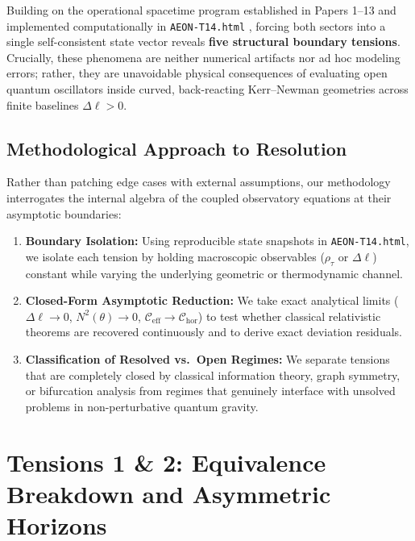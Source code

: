 \documentclass[11pt,a4paper]{article}
\begin{document}
Building on the operational spacetime program established in Papers 1--13 \cite{damasio_compendium,damasio_p9,damasio_p10} and implemented computationally in \texttt{AEON-T14.html} \cite{damasio_aeont14}, forcing both sectors into a single self-consistent state vector reveals \textbf{five structural boundary tensions}. Crucially, these phenomena are neither numerical artifacts nor ad hoc modeling errors; rather, they are unavoidable physical consequences of evaluating open quantum oscillators inside curved, back-reacting Kerr--Newman geometries across finite baselines $\Delta\ell > 0$.

\subsection{Methodological Approach to Resolution}
Rather than patching edge cases with external assumptions, our methodology interrogates the internal algebra of the coupled observatory equations at their asymptotic boundaries:
\begin{enumerate}
    \item \textbf{Boundary Isolation:} Using reproducible state snapshots in \texttt{AEON-T14.html}, we isolate each tension by holding macroscopic observables ($\rho_\tau$ or $\Delta\ell$) constant while varying the underlying geometric or thermodynamic channel.
    \item \textbf{Closed-Form Asymptotic Reduction:} We take exact analytical limits ($\Delta\ell \to 0$, $N^2(\theta) \to 0$, $\mathcal{C}_{\mathrm{eff}} \to \mathcal{C}_{\mathrm{hor}}$) to test whether classical relativistic theorems are recovered continuously and to derive exact deviation residuals.
    \item \textbf{Classification of Resolved vs.\ Open Regimes:} We separate tensions that are completely closed by classical information theory, graph symmetry, or bifurcation analysis from regimes that genuinely interface with unsolved problems in non-perturbative quantum gravity.
\end{enumerate}
\section{Tensions 1 \& 2: Equivalence Breakdown and Asymmetric Horizons}
\end{document}
